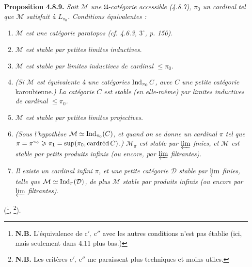 \textbf{Proposition 4.8.9.} \textit{Soit $\mathcal{M}$ une $\mathfrak{U}$-catégorie accessible (4.8.7), $\pi_0$ un cardinal tel que $\mathcal{M}$ satisfait à $L_{\pi_0}$. Conditions équivalentes :}
\begin{enumerate}
\item[\textit{a)}] \textit{$\mathcal{M}$ est une catégorie paratopos (cf. 4.6.3, $3^\circ$, p. 150).}
\item[\textit{b)}] \textit{$\mathcal{M}$ est stable par petites limites inductives.}
\item[\textit{b$'$)}] \textit{$\mathcal{M}$ est stable par limites inductives de cardinal $\leqslant\pi_0$.}
\item[\textit{b$''$)}] \textit{(Si $\mathcal{M}$ est équivalente à une catégories} $\operatorname{Ind}_{\pi_0}C$\textit{, avec $C$ une petite catégorie} karoubienne.\textit{) La catégorie $C$ est stable (en elle-même) par limites inductives de cardinal $\leqslant\pi_0$.} %
\item[\textit{c)}] \textit{$\mathcal{M}$ est stable par petites limites projectives.}
\item[\textit{c$'$)}] \textit{(Sous l'hypothèse $\mathcal{M}\simeq\operatorname{Ind}_{\pi_0}(C)$, et quand on se donne un cardinal $\pi$ tel que $\pi=\pi^{\pi_0}\geqslant\pi_1=\sup(\pi_0,\mathrm{card}\textup{réd}\,C)$.) $\mathcal{M}_\pi$ est stable par $\varprojlim$ finies, et $\mathcal{M}$ est stable par petits produits infinis (ou encore, par $\varprojlim$ filtrantes).}
\item[\textit{c$''$)}] \textit{Il existe un cardinal infini $\pi$, et une petite catégorie $\mathcal{D}$ stable par $\varprojlim$ finies, telle que $\mathcal{M}\simeq\operatorname{Ind}_\pi(\mathcal{D})$, de plus $\mathcal{M}$ stable par produits infinis (ou encore par $\varprojlim$ filtrantes).}
\end{enumerate}
(\footnote{\textbf{N.B.} L'équivalence de c$'$, c$''$ avec les autres conditions n'est pas établie (ici, mais seulement dans 4.11 plus bas.)}, \footnote{\textbf{N.B.} Les critères c$'$, c$''$ me paraissent plus techniques et moins utiles.}).

